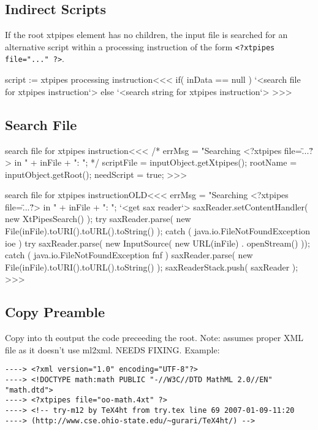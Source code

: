 \documentclass{article}
\begin{document}
{%
\subsection{Indirect Scripts}



If the root xtpipes element has no children, the input file is
searched for an alternative script within a processing instruction of
the form \verb+<?xtpipes file="..." ?>+.

\<script := xtpipes processing instruction\><<<
if( inData == null ){
   `<search file for xtpipes instruction`>
} else {
   `<search string for xtpipes instruction`>
}
>>>


\subsection{Search File}




\<search file for xtpipes instruction\><<<
/*
errMsg = "Searching <?xtpipes file=\"...\"?>  in "
                      + inFile + ": ";
*/
scriptFile = inputObject.getXtpipes();
rootName = inputObject.getRoot();
needScript = true;
>>>

\<search file for xtpipes instructionOLD\><<<
errMsg = "Searching <?xtpipes file=\"...\"?>  in "
                      + inFile + ": ";
       `<get sax reader`>      
       saxReader.setContentHandler( new XtPipesSearch() );
try{
    saxReader.parse( new File(inFile).toURI().toURL().toString() );
} catch ( java.io.FileNotFoundException ioe ){           
    try{
       saxReader.parse( new InputSource(
                        new URL(inFile) . openStream() ));  
    } catch ( java.io.FileNotFoundException fnf ){           
        saxReader.parse( new File(inFile).toURI().toURL().toString() );         
}   } 
       saxReaderStack.push( saxReader );
>>>

\subsection{Copy Preamble}


Copy into th eoutput the code preceeding the root. Note: assumes proper 
XML file as it doesn't use ml2xml. NEEDS FIXING.
Example:

\begin{verbatim}
----> <?xml version="1.0" encoding="UTF-8"?>  
----> <!DOCTYPE math:math PUBLIC "-//W3C//DTD MathML 2.0//EN" "math.dtd">  
----> <?xtpipes file="oo-math.4xt" ?>  
----> <!-- try-m12 by TeX4ht from try.tex line 69 2007-01-09-11:20  
----> (http://www.cse.ohio-state.edu/~gurari/TeX4ht/) -->  
\end{verbatim}



}
\end{document}
